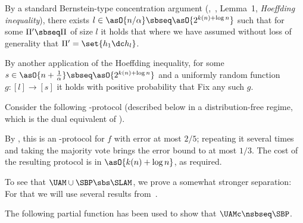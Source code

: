 %
%

By a standard Bernstein-type concentration argument (\eg,~\cite{DM05_Con}, Lemma~1, \emph{Hoeffding inequality}),
%
%
%
%
%
%
there exists $l\in\asO{n/\alpha}\sbseq\asO{2^{k(n)+\log n}}$ such that for some $\Pi'\sbseq\Pi$ of size $l$ it holds that
where we have assumed without loss of generality that $\Pi'=\set{h_1\dc h_l}$.
%

By another application of the %
Hoeffding inequality, %
%
for some $s\in\asO{n+ \frac1\alpha}\sbseq\asO{2^{k(n)+\log n}}$ and a
%
uniformly random   %
function $g:[l]\to[s]$ it holds with positive probability that
Fix any such $g$.

Consider the following \AM-protocol (described below in a distribution-free regime, which is the dual equivalent of ).

By , this is an \AM-protocol for $f$ with error at most $2/5$; repeating it several times and taking the majority vote brings the error bound to at most $1/3$.
%
The cost of the resulting protocol is in $\asO{k(n)+\log n}$, as required.
\prfend

To see that $\UAM\cup\SBP \sbs \SLAM$, we prove a somewhat stronger separation:
For that we will use several results from~\cite{GPW15_Zero, GLMWZ16_Rec}.


The following partial function has been used to show that $\UAMc \nsbseq \SBP$.

%
%
%
%
%
%
%
%

%
%

%


